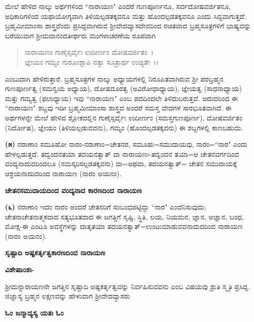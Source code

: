 ಮೇಲೆ ಹೇಳಿದ ನಾಲ್ಕು ಅರ್ಥಗಳಿಂದ ``ನಾರಾಯಣ" ಎಂದರೆ ಗುಣಪೂರ್ಣನೂ, ಸರ್ವದೋಷವರ್ಜಿತನೂ, ಅಧಿಕಾರಿಗಳಿಂದ ಯಥಾಯೋಗ್ಯವಾಗಿ ತಿಳಿಯಲ್ಪಡತಕ್ಕವನೂ ಮತ್ತು ಹೊಂದಲ್ಪಡತಕ್ಕವನೂ ಎಂದು ಸಿದ್ದವಾಗುತ್ತದೆ. ಬ್ರಹ್ಮಮೀಮಾಂಸಾ ಶಾಸ್ತ್ರವೆಂದು ಪ್ರಸಿದ್ದವಾಗಿರುವ ಶ‍್ರೀವೇದವ್ಯಾಸದೇವರಿಂದ ರಚಿತವಾದ ಬ್ರಹ್ಮಸೂತ್ರಗಳಿಗೆ ಭಾಷ್ಯವನ್ನು ಬರೆಯುವಾಗ ಶ‍್ರೀಮದಾನಂದತೀರ್ಥರು ಮಂಗಳಾಚರಣೆಯ ರೂಪವಾಗಿ

\begin{verse}
ನಾರಾಯಣಂ ಗುಣೈಸ್ಸರ್ವೈಃ ಉದೀರ್ಣಂ ದೋಷವರ್ಜಿತಂ~।\\ ಜ್ಞೇಯಂ ಗಮ್ಯಂ ಗುರೂಂಶ್ಚಾಪಿ ನತ್ವಾ ಸೂತ್ರಾರ್ಥ ಉಚ್ಯತೇ~।।
\end{verse}

\noindent
ಎಂಬುದಾಗಿ ಹೇಳಿರುತ್ತಾರೆ. ಬ್ರಹ್ಮಸೂತ್ರಗಳ ನಾಲ್ಕು ಅಧ್ಯಾಯಗಳಲ್ಲಿ ನಿರೂಪಿತವಾಗಿರುವ ಶ‍್ರೀ ಪರಬ್ರಹ್ಮನ ಗುಣಪೂರ್ಣತ್ವ (ಸಮನ್ವಯ ಅಧ್ಯಾಯ), ದೋಷದೂರತ್ವ (ಅವಿರೋಧಾಧ್ಯಾಯ), ಜ್ಞೇಯತ್ವ (ಸಾಧನಾಧ್ಯಾಯ) ಮತ್ತು ಗಮ್ಯತ್ವ (ಫಲಾಧ್ಯಾಯ) ಇವು ``ನಾರಾಯಣ" ಎಂಬ ಪದದಿಂದಲೇ ತಿಳಿದುಬರುತ್ತವೆ. ಆದುದರಿಂದ ಈ ``ನಾರಾಯಣ" ಶಬ್ದವು ಇಡೀ ಬ್ರಹ್ಮಮೀಮಾಂಸಾ ಶಾಸ್ತ್ರದ ಅಂದರೆ ಸಮಸ್ತ ವೇದಗಳ ಸಾರಭೂತವಾಗಿದೆ. ಈ ಅರ್ಥಗಳನ್ನೇ ಮೇಲೆ ಹೇಳಿದ ಶ್ಲೋಕದಲ್ಲಿನ ಗುಣೈಸ್ಸರ್ವೈಃ ಉದೀರ್ಣಂ (ಸಮಸ್ತಗುಣಪೂರ್ಣ), ದೋಷವರ್ಜಿತಂ (ನಿರ್ದೋಷ), ಜ್ಞೇಯಂ (ತಿಳಿಯಲ್ಪಡುವವನು), ಗಮ್ಯಂ (ಹೊಂದಲ್ಪಡತಕ್ಕವನು) ಈ ಶಬ್ದಗಳಲ್ಲಿ ಕಾಣಬಹುದು.

\textbf{(೫)} ನರಾಣಾಂ ಸಮೂಹೋ ನಾರಂ-ನರಾಣಾಂ=ಚೇತನರ, ಸಮೂಹಃ=ಸಮುದಾಯವು, ನಾರಂ=``ನಾರ" ಎಂದು ಹೇಳಲ್ಪಡುತ್ತದೆ. ತದ್ವಂದನತಯಾ ತದಯನತ್ವಾತ್ ವಾ ನಾರಾಯಣಃ-ತದ್ವಂದನ ತಯಾ=ಆ ಚೇತನವರ್ಗದಿಂದ ವಂದ್ಯನಾದುದರಿಂದಲೂ (ನಮಸ್ಕರಿಸಲ್ಪಡತಕ್ಕವನು) ವಾ=ಅಥವಾ, ತದಯನತ್ವಾತ್= ಚೇತನ ಸಮುದಾಯಕ್ಕೆ ಆಶ್ರಯನಾದುದರಿಂದ ನಾರಾಯಣ (ನಾರಂ ಅಯನಂ).

\begin{center}
\textbf{ಚೇತನಸಮುದಾಯದಿಂದ ವಂದ್ಯನಾದ ಕಾರಣದಿಂದ ನಾರಾಯಣ}
\end{center}

\textbf{(೬)} ನರಾಣಾಂ ಇದಂ ನಾರಂ ಅಂದರೆ ಚೇತನರಿಗೆ ಸಂಬಂಧಪಟ್ಟಿದ್ದು ``ನಾರ" ಎಂದೆನಿಸುವುದು; ಚೇತನಾಚೇತನಾತ್ಮಕವಾದ ಸತ್ಯಭೂತವಾದ ಈ ಜಗತ್ತಿಗೆ ಸೃಷ್ಟಿ, ಸ್ಥಿತಿ, ಲಯ, ನಿಯಮನ, ಜ್ಞಾನ, ಅಜ್ಞಾನ, ಬಂಧ, ಮೋಕ್ಷ-ಈ ಎಂಟೂ ಅವಸ್ಥೆಗಳನ್ನು ದಾತೃತಯಾ ತದಯನತ್ವಾತ್=ಉಂಟುಮಾಡುವವನಾದುದರಿಂದ ನಾರಾಯಣ (ನಾರಂ ಅಯನಂ).

\begin{center}
\textbf{ಸೃಷ್ಟಾದಿ ಅಷ್ಟಕರ್ತೃತ್ವಕಾರಣದಿಂದ ನಾರಾಯಣ}
\end{center}

\noindent
\textbf{ವಿಶೇಷಾಂಶಃ-}

ಶ‍್ರೀಮನ್ನಾರಾಯಣನೇ ಜಗತ್ತಿನ ಸೃಷ್ಟಾದಿ ಅಷ್ಟಕರ್ತೃತ್ವವನ್ನು ನಿರ್ವಹಿಸುವವನು ಎಂಬ ವಿಷಯವು ಶ್ರುತಿ ಸ್ಮೃತಿ ಪ್ರಸಿದ್ದ. ಜಿಜ್ಞಾಸ್ಯ ಬ್ರಹ್ಮನ ಲಕ್ಷಣವನ್ನು ಹೇಳುವಾಗ ಶ‍್ರೀವೇದವ್ಯಾಸರು

\begin{center}
\textbf{ಓಂ ಜನ್ಮಾದ್ಯಸ್ಯ ಯತಃ ಓಂ}
\end{center}

